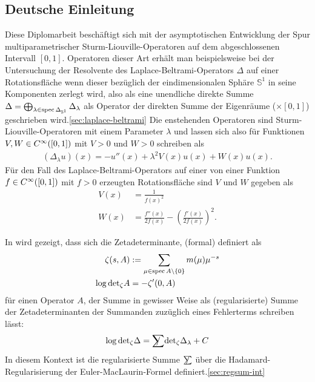 \subsection{Deutsche Einleitung}
Diese Diplomarbeit beschäftigt sich mit der asymptotischen Entwicklung der Spur
multiparametrischer Sturm-Liouville-Operatoren auf dem abgeschlossenen Intervall
$[0,1]$.
%
Operatoren dieser Art erhält man beispielsweise bei der Untersuchung der
Resolvente des Laplace-Beltrami-Operators $\Delta$ auf einer Rotationsfläche
wenn dieser bezüglich der eindimensionalen Sphäre $\mathbb{S}^1$ in seine
Komponenten zerlegt wird, also als eine unendliche direkte Summe $\Delta =
\bigoplus_{\lambda\in\operatorname{spec}\Delta_{{\mathbb{S}^{1}}}}\Delta_\lambda$ als Operator der
direkten Summe der Eigenräume ($\times[0,1]$) geschrieben
wird.\ref{sec:laplace-beltrami}
%
Die enstehenden Operatoren sind Sturm-Liouville-Operatoren mit einem Parameter
$\lambda$ und lassen sich also für Funktionen $V,W\in C^\infty_{}([0,1])$ mit $V > 0$
und $W > 0$ schreiben als
\begin{align*}
  (\Delta_\lambda u)(x) = -u''(x) + \lambda^2 V(x) u(x) + W(x) u(x).
\end{align*}
Für den Fall des Laplace-Beltrami-Operators auf einer von einer Funktion
$f\in C^\infty_{}([0,1])$ mit $f>0$ erzeugten Rotationsfläche sind $V$ und $W$ gegeben
als
\begin{align*}
  V(x) &= \frac1{f(x)^2} \\
  W(x) &= \frac{f''(x)}{2f(x)} - \left(\frac{f'(x)}{2f(x)}\right)^2.
\end{align*}

In \cite{LV13} wird gezeigt, dass sich die Zetadeterminante, (formal) definiert
als
\begin{align*}
  \zeta(s,A) &:= \sum_{\mu\in\operatorname{spec}A\setminus\{0\}} m(\mu)\mu^{-s}
  \\
  \log{\det}_\zeta A &= -\zeta'(0,A)
\end{align*}
für einen Operator $A$, der Summe in gewisser Weise als (regularisierte) Summe
der Zetadeterminanten der Summanden zuzüglich eines Fehlerterms schreiben lässt:
\begin{align*}
  \label{eqn:intro-de-lvformel}
  \log{\det}_\zeta\Delta = \slashed{\sum}{\det}_\zeta\Delta_\lambda + C
\end{align*}
In diesem Kontext ist die regularisierte Summe $\slashed{\sum}$ über die
Hadamard-Regularisierung der Euler-MacLaurin-Formel
definiert.\ref{sec:regsum-int}


